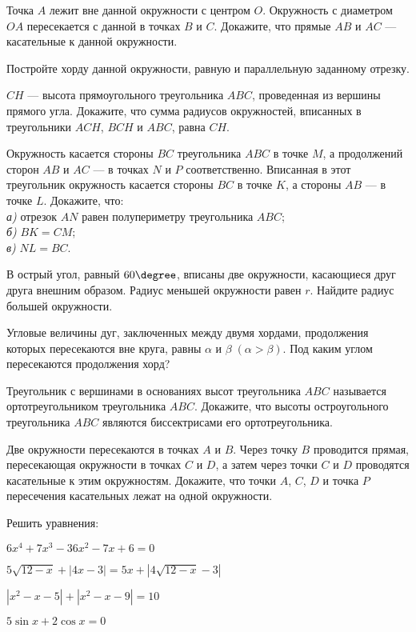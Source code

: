 \begin{listofex}
	\item Точка \( A \) лежит вне данной окружности с центром \( O \).
	Окружность с диаметром \( OA \) пересекается с данной в точках \( B \)
	и \( C \). Докажите, что прямые \( AB \) и \( AC \) --- касательные к данной
	окружности.
	\item Постройте хорду данной окружности, равную и параллельную заданному отрезку.
	\item \( CH \) --- высота прямоугольного треугольника \( ABC \),
	проведенная из вершины прямого угла. Докажите, что сумма
	радиусов окружностей, вписанных в треугольники \( ACH \), \( BCH \)
	и \( ABC \), равна \( CH \).
	\item Окружность касается стороны \( BC \) треугольника
	\( ABC \) в точке \( M \), а продолжений сторон \( AB \) и \( AC \) ---
	в точках \( N \) и \( P \) соответственно. Вписанная в этот треугольник
	окружность касается стороны \( BC \) в точке \( K \), а стороны \( AB \) ---
	в точке \( L \). Докажите, что:\\
	\textit{а)} отрезок \( AN \) равен полупериметру треугольника \( ABC \);\\
	\textit{б)} \( BK = CM \);\\
	\textit{в)} \( NL = BC \).
	\item В острый угол, равный \( 60\degree \), вписаны две окружности, касающиеся друг друга внешним образом. Радиус меньшей окружности равен \( r \). Найдите радиус большей окружности.
	\item Угловые величины дуг, заключенных между двумя хордами, продолжения которых
	пересекаются вне круга, равны \( \alpha \) и \( \beta\;(\alpha>\beta)\). Под каким углом пересекаются продолжения хорд?
	\item Треугольник с вершинами в основаниях высот треугольника \( ABC \) называется ортотреугольником треугольника \( ABC \). Докажите, что высоты остроугольного треугольника \( ABC \) являются биссектрисами его ортотреугольника.
	\item Две окружности пересекаются в точках \( A \) и \( B \). Через
	точку \( B \) проводится прямая, пересекающая окружности в точках \( C \) и \( D \), а затем через точки \( C \) и \( D \) проводятся касательные
	к этим окружностям. Докажите, что точки \( A \), \( C \), \( D \) и точка \( P \)
	пересечения касательных лежат на одной окружности.
	\item Решить уравнения:
	\begin{enumcols}[itemcolumns=2]
		\item \( 6x^4+7x^3-36x^2-7x+6=0 \)
		\item \( 5\sqrt{12-x}+|4x-3|=5x+|4\sqrt{12-x}-3| \)
		\item \( |x^2-x-5|+|x^2-x-9|=10  \)
		\item \( 5\sin x + 2\cos x = 0 \)
	\end{enumcols}
\end{listofex}
